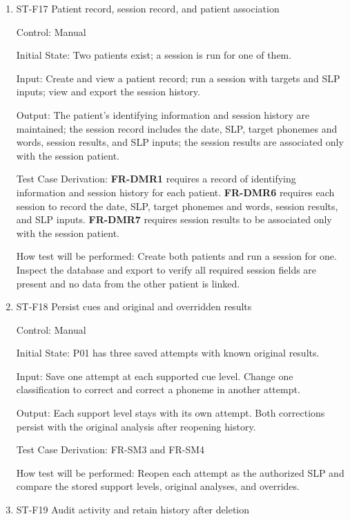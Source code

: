 \documentclass[12pt, titlepage]{article}
\begin{document}
\begin{enumerate}

\item{ST-F17 Patient record, session record, and patient association\\}

Control: Manual

Initial State: Two patients exist; a session is run for one of them.

Input: Create and view a patient record; run a session with targets and SLP inputs; view and export the session history.

Output: The patient's identifying information and session history are maintained; the session record includes the date, SLP, target 
phonemes and words, session results, and SLP inputs; the session results are associated only with the session patient.

Test Case Derivation: \textbf{FR-DMR1} requires a record of identifying information and session history for each patient. 
\textbf{FR-DMR6} requires each session to record the date, SLP, target phonemes and words, session results, and SLP inputs. 
\textbf{FR-DMR7} requires session results to be associated only with the session patient.

How test will be performed: Create both patients and run a session for one. Inspect the database and export to verify all required 
session fields are present and no data from the other patient is linked.

\item{ST-F18 Persist cues and original and overridden results\\}

Control: Manual

Initial State: P01 has three saved attempts with known original results.

Input: Save one attempt at each supported cue level. Change one classification to correct and correct a phoneme in another attempt.

Output: Each support level stays with its own attempt. Both corrections persist with the original analysis after reopening history.

Test Case Derivation: FR-SM3 and FR-SM4

How test will be performed: Reopen each attempt as the authorized SLP and compare the stored support levels, original analyses, and overrides.

\item{ST-F19 Audit activity and retain history after deletion\\}


\end{enumerate}
\end{document}
